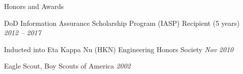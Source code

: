 \begin{rBulletSection}{Honors and Awards}

    \item DoD Information Assurance Scholarship Program (IASP) Recipient (5 years) \hfill \emph{2012 -- 2017}

    \item Inducted into Eta Kappa Nu (HKN) Engineering Honors Society \hfill \emph{Nov 2010}

    \item Eagle Scout, Boy Scouts of America \hfill \emph{2002}

\end{rBulletSection}
